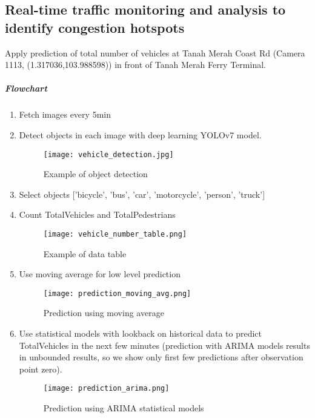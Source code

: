 \documentclass{intcov_report}
\begin{document}
\subsection{Real-time traffic monitoring and analysis to identify congestion hotspots}

Apply prediction of total number of vehicles at Tanah Merah Coast Rd (Camera 1113, (1.317036,103.988598)) in front of Tanah Merah Ferry Terminal. 


\subparagraph{Flowchart}

\begin{enumerate}
\item Fetch images every 5min 
\item Detect objects in each image with deep learning YOLOv7 model.
     \begin{figure}[H]
         \centering
         \texttt{[image: vehicle\_detection.jpg]}
         \label{fig:vehicle_detection}
         \caption{Example of object detection}
     \end{figure}
     
\item Select objects ['bicycle', 'bus', 'car', 'motorcycle', 'person', 'truck']
\item Count TotalVehicles and TotalPedestrians 
     \begin{figure}[H]
         \centering
         \texttt{[image: vehicle\_number\_table.png]}
         \label{fig:vehicle_number_table}
         \caption{Example of data table}
     \end{figure}

\item Use moving average for low level prediction 

     \begin{figure}[H]
         \centering
         \texttt{[image: prediction\_moving\_avg.png]}
         \label{fig:prediction_moving_avg}
         \caption{Prediction using moving average}
     \end{figure}
  
\item Use statistical models with lookback on historical data to predict TotalVehicles in the next few minutes (prediction with ARIMA models results in unbounded results, so we show only first few predictions after observation point zero).

     \begin{figure}[H]
         \centering
         \texttt{[image: prediction\_arima.png]}
         \label{fig:prediction_arima}
         \caption{Prediction using ARIMA statistical models}
     \end{figure}
   

\end{enumerate}
\end{document}
